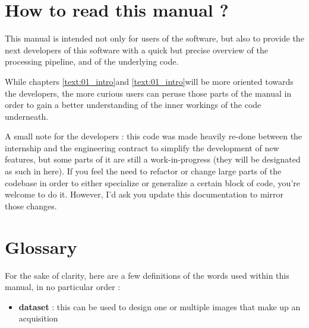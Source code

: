 \section{How to read this manual ?}\label{text:01_intro:02_howtoread}
{

	This manual is intended not only for users of the software, but also to provide the next developers of this software with a quick but precise overview of the processing pipeline, and of the underlying code.

	While chapters \ref{text:01_intro}\footnotemark and \ref{text:01_intro}\footnotemark will be more oriented towards the developers, the more curious users can peruse those parts of the manual in order to gain a better understanding of the inner workings of the code underneath.

	A small note for the developers : this code was made heavily re-done between the internship and the engineering contract to simplify the development of new features, but some parts of it are still a work-in-progress (they will be designated as such in here). If you feel the need to refactor or change large parts of the codebase in order to either specialize or generalize a certain block of code, you're welcome to do it. However, I'd ask you update this documentation to mirror those changes.
}

\section{Glossary}\label{text:01_intro:03_definitions}
{
	For the sake of clarity, here are a few definitions of the words used within this manual, in no particular order :

	\begin{itemize}
		\item \textbf{dataset} : this can be used to design one or multiple images that make up an acquisition
	\end{itemize}
}

